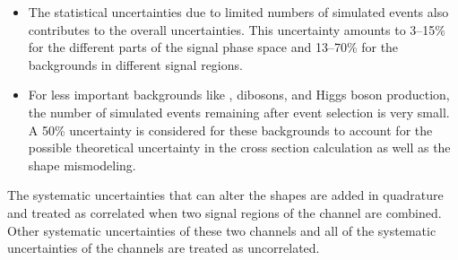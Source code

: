 \begin{itemize}
\item The statistical uncertainties due to limited numbers of simulated events also contributes to the overall uncertainties. 
This uncertainty amounts to 3--15\% for the different parts of the signal phase space and 13--70\% for the backgrounds in different signal regions.


\item For less important backgrounds like \ttbar,  dibosons, and Higgs boson production, the number of simulated events remaining after event selection is very small. 
A 50\% uncertainty is considered for these backgrounds to account for the possible theoretical uncertainty in the
cross section calculation as well as the shape mismodeling.
\end{itemize}



\noindent The systematic uncertainties that can alter the shapes are added in quadrature and 
treated as correlated when two signal regions of the \tauTau channel are combined. Other systematic uncertainties of these two 
channels and all of the systematic uncertainties of the \leptonTau channels are treated as uncorrelated.


